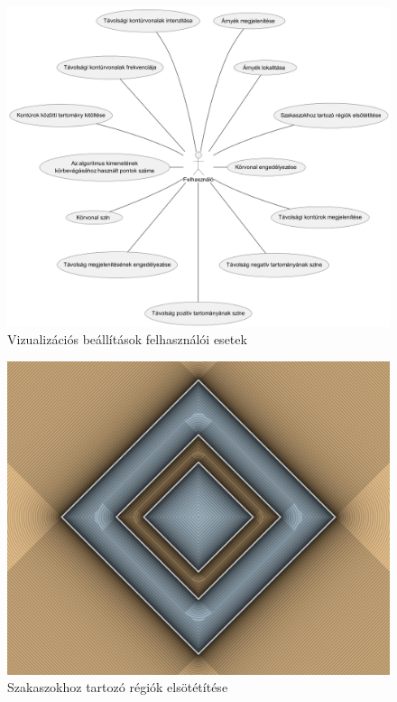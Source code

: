 \begin{figure}[H]
    \centering
    \includegraphics[width=1\linewidth]{images/usecase_visualization_settings.png}
    \caption{Vizualizációs beállítások felhasználói esetek}
    \label{fig:usecase_visualization_settings-1}
\end{figure}

\begin{figure}[H]
    \centering
    \includegraphics[width=0.85\linewidth]{images/darken_segment_regions.png}
    \caption{Szakaszokhoz tartozó régiók elsötétítése}
    \label{fig:darken_segment_regions-1}
\end{figure}

